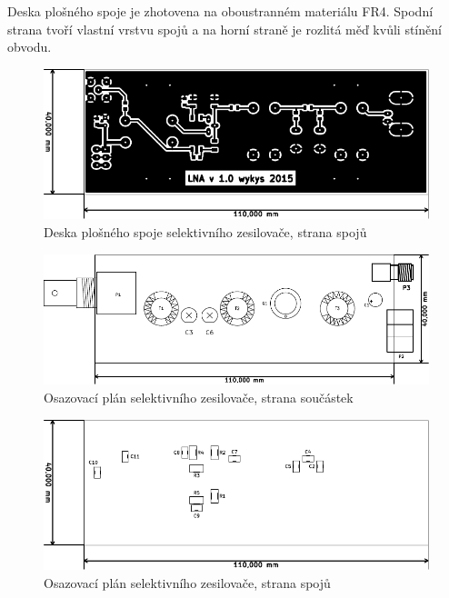 Deska plošného spoje je zhotovena na oboustranném materiálu FR4. Spodní strana tvoří vlastní vrstvu spojů a na horní straně je rozlitá měď kvůli stínění obvodu.

\begin{figure}[H]
	\centering
	\includegraphics[width=170mm]{img/LNA/cu_b.pdf}
	\caption{Deska plošného spoje selektivního zesilovače, strana spojů}    		
\end{figure}

\begin{figure}[H]
	\centering
	\includegraphics[width=170mm]{img/LNA/os_f.pdf}
	\caption{Osazovací plán selektivního zesilovače, strana součástek}    		
\end{figure}

\begin{figure}[H]
	\centering
	\includegraphics[width=170mm]{img/LNA/os_b.pdf}
	\caption{Osazovací plán selektivního zesilovače, strana spojů}    		
\end{figure}

